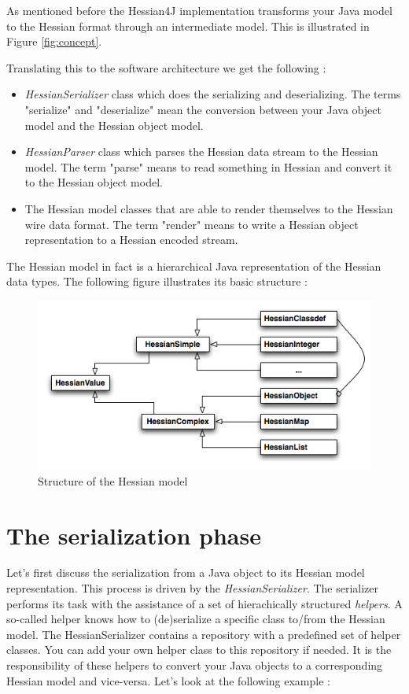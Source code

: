 \documentclass[a4paper]{article}
\begin{document}
As mentioned before the Hessian4J implementation transforms your Java model to the Hessian format through an intermediate model. This is illustrated in Figure \ref{fig:concept}.

Translating this to the software architecture we get the following :

\begin{itemize}
	\item \emph{HessianSerializer} class which does the serializing and deserializing. The terms "serialize" and "deserialize" mean the conversion between your Java object model and the Hessian object model.
	\item \emph{HessianParser} class which parses the Hessian data stream to the Hessian model. The term "parse" means to read something in Hessian and convert it to the Hessian object model.
	\item The Hessian model classes that are able to render themselves to the Hessian wire data format. The term "render" means to write a Hessian object representation to a Hessian encoded stream.
\end{itemize}

The Hessian model in fact is a hierarchical Java representation of the Hessian data types. The following figure illustrates its  basic structure :

\smallskip
\begin{figure}[htp]
\centering
\includegraphics[scale=0.8]{model.png}
\caption{Structure of the Hessian model}\label{fig:model}
\end{figure}
\smallskip

\section{The serialization phase}

Let's first discuss the serialization from a Java object to its Hessian model representation. This process is driven by the \emph{HessianSerializer}. The serializer performs its task with the assistance of a set of hierachically structured \emph{helpers}. A so-called helper knows how to (de)serialize a specific class to/from the Hessian model. The HessianSerializer contains a repository with a predefined set of helper classes. You can add your own helper class to this repository if needed. It is the responsibility of these helpers to convert your Java objects to a corresponding Hessian model and vice-versa. Let's look at the following example :
\end{document}
